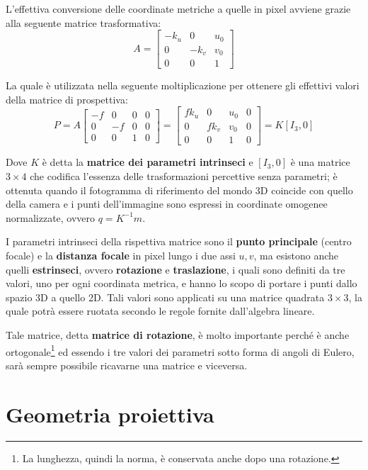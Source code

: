 \noindent L'effettiva conversione delle coordinate metriche a quelle in pixel avviene grazie alla seguente matrice trasformativa: \[ A = \begin{bmatrix}
	-k_u & 0 & u_0\\
	0 & -k_v & v_0\\
	0 & 0 & 1
\end{bmatrix} \]

\noindent La quale è utilizzata nella seguente moltiplicazione per ottenere gli effettivi valori della matrice di prospettiva: \[
	P = A\begin{bmatrix}
	-f & 0 & 0 & 0\\
	0 & -f & 0 & 0\\
	0 & 0 & 1 & 0
\end{bmatrix} = \begin{bmatrix}
	fk_u & 0 & u_0 & 0\\
	0 & fk_v & v_0 & 0\\
	0 & 0 & 1 & 0
\end{bmatrix} = K[I_3, 0] \]

\noindent Dove $K$ è detta la \textbf{matrice dei parametri intrinseci} e $[I_3, 0]$ è una matrice $3\times 4$ che codifica l'essenza delle
trasformazioni percettive senza parametri; è ottenuta quando il fotogramma di riferimento del mondo 3D coincide con quello della camera e i punti
dell'immagine sono espressi in coordinate omogenee normalizzate, ovvero $q = K^{-1}m$.\par
I parametri intrinseci della rispettiva matrice sono il \textbf{punto principale} (centro focale) e la \textbf{distanza focale} in pixel lungo i due
assi $u,v$, ma esistono anche quelli \textbf{estrinseci}, ovvero \textbf{rotazione} e \textbf{traslazione}, i quali sono definiti da tre valori, uno per
ogni coordinata metrica, e hanno lo scopo di portare i punti dallo spazio 3D a quello 2D. Tali valori sono applicati su una matrice quadrata $3\times 3$,
la quale potrà essere ruotata secondo le regole fornite dall'algebra lineare.\par
Tale matrice, detta \textbf{matrice di rotazione}, è molto importante perché è anche ortogonale\footnote{La lunghezza, quindi la norma, è conservata
anche dopo una rotazione.} ed essendo i tre valori dei parametri sotto forma di angoli di Eulero, sarà sempre possibile ricavarne una matrice e
viceversa.


%

\section{Geometria proiettiva}